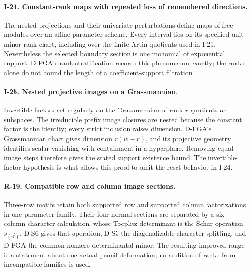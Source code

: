 \paragraph{I-24. Constant-rank maps with repeated loss of remembered directions.}
The nested projections and their univariate perturbations define maps of free modules over an affine parameter scheme. Every interval lies on its specified unit-minor rank chart, including over the finite Artin quotients used in I-21. Nevertheless the selected boundary section is one monomial of exponential support. D-FGA's rank stratification records this phenomenon exactly; the ranks alone do not bound the length of a coefficient-support filtration.

\paragraph{I-25. Nested projective images on a Grassmannian.}
Invertible factors act regularly on the Grassmannian of rank-$r$ quotients or subspaces. The irreducible prefix image closures are nested because the constant factor is the identity; every strict inclusion raises dimension. D-FGA's Grassmannian chart gives dimension $r(w-r)$, and its projective geometry identifies scalar vanishing with containment in a hyperplane. Removing equal-image steps therefore gives the stated support existence bound. The invertible-factor hypothesis is what allows this proof to omit the reset behavior in I-24.

\paragraph{R-19. Compatible row and column image sections.}
Three-row motifs retain both supported row and supported column factorizations in one parameter family. Their four normal sections are separated by a six-column character calculation, whose Toeplitz determinant is the Schur operation $s_{(6^b)}$. D-S6 gives that operation, D-S3 the diagonalizable character splitting, and D-FGA the common nonzero determinantal minor. The resulting improved range is a statement about one actual pencil deformation; no addition of ranks from incompatible families is used.


